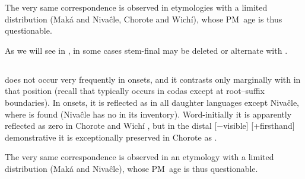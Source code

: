 \begin{exe}
    \ex \fatv
    \ex \najendup
    \ex \centipede
    \ex \crab
    \ex \north
    \ex \suncho
    \ex \sandisaj
    \ex \takeaway
    \ex \dividev
    \ex \barnowl
    \ex \oldn
    \ex \manysg
    \ex \quick
    \ex \jabiru
    \ex \deep \label{deep-resyll}
    \ex \longv
    \ex \anteater
    \ex \pseudo
    \ex \shoot
    \ex \far \label{far-resyll}
    \ex \fullriver \label{fullriver-resyll}
    \ex \tsofatajf
    \ex \tired
    \ex \largefat
    \ex \paloflojof
    \ex \blackalgarrobof
    \ex \rhea
    \ex \night
    \ex \tuscaf
    \ex \caracara
    \ex \jararaca
    \ex \snakeatuj
    \ex \peccary
    \ex \mistolf
    \ex \hurt
    \ex \argentineboa
    \ex \chaguara
    \ex \wildbean
    \ex \widower
    \ex \firei
    \ex \bro
    \ex \puma
\end{exe}

The very same correspondence is observed in etymologies with a limited distribution (Maká and Nivaĉle, Chorote and Wichí), whose PM~age is thus questionable.

\begin{exe}
    \ex \ocelot
    \ex \runv
    \ex \siyaj
    \ex \smoke
    \ex \burnvi
    \ex \piranhamn
    \ex \mollef
\end{exe}

As we will see in , in some cases stem-final  may be deleted or alternate with .

\subsection{}\label{proto-h}
 does not occur very frequently in onsets, and it contrasts only marginally with  in that position (recall that  typically occurs in codas except at root–suffix boundaries). In onsets, it is reflected as  in all daughter languages except Nivaĉle, where  is found (Nivaĉle has no  in its inventory). Word-initially it is apparently reflected as zero in Chorote and Wichí , but in the distal [−visible] [+firsthand] demonstrative it is exceptionally preserved in Chorote as  .

\begin{exe}
    \ex \demh \label{h-demh}
    \ex \acti \label{h-acti}
    \ex \welln
    \ex \chaja
\end{exe}

The very same correspondence is observed in an etymology with a limited distribution (Maká and Nivaĉle), whose PM~age is thus questionable.

